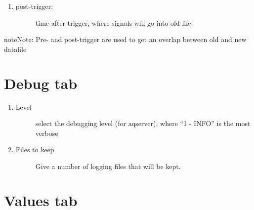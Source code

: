 \documentclass[a4paper,10pt,english]{sphinxmanual}
\begin{document}
\begin{enumerate}
\begin{description}
\end{description}

\item {} \begin{description}
\item[{post-trigger:}] \leavevmode
time after trigger, where signals will go into old file

\end{description}

\end{enumerate}

\begin{sphinxadmonition}{note}{Note:}
Pre- and post-trigger are used to get an overlap between old and new datafile
\end{sphinxadmonition}


\chapter{Debug tab}
\label{\detokenize{debug:debug-tab}}\label{\detokenize{debug::doc}}
\begin{enumerate}
%
\item {} \begin{description}
\item[{Level}] \leavevmode
select the debugging level (for aqserver), where “1 - INFO” is the most verbose

\end{description}

\item {} \begin{description}
\item[{Files to keep}] \leavevmode
Give a number of logging files that will be kept.

\end{description}

\end{enumerate}


\chapter{Values tab}
\label{\detokenize{values:values-tab}}\label{\detokenize{values::doc}}
\end{document}
